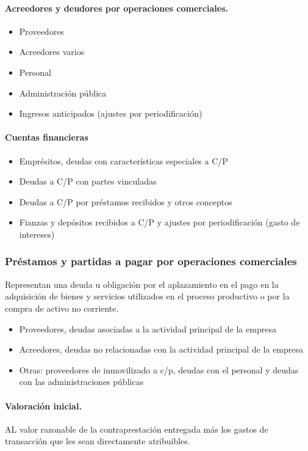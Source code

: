 \paragraph{Acreedores y deudores por operaciones comerciales.}
\begin{itemize}
    \item Proveedores
    \item Acreedores varios
    \item Personal
    \item Administración pública
    \item Ingresos anticipados (ajustes por periodificación)
\end{itemize}

\paragraph{Cuentas financieras}
\begin{itemize}
    \item Emprésitos, deudas con características especiales a C/P
    \item Deudas a C/P con partes vinculadas
    \item Deudas a C/P por préstamos recibidos y otros conceptos
    \item Fianzas y depósitos recibidos a C/P y ajustes por periodificación (gasto de intereses)
\end{itemize}

\subsubsection{Préstamos y partidas a pagar por operaciones comerciales}
Representan una deuda u obligación por el aplazamiento en el pago en la adquisición de bienes y servicios utilizados en el proceso productivo o por la compra de activo no corriente.
\begin{itemize}
    \item Proveedores, deudas asociadas a la actividad principal de la empresa
    \item Acreedores, deudas no relacionadas con la actividad principal de la empresa
    \item Otras: proveedores de inmovilizado a c/p, deudas con el personal y deudas con las administraciones públicas
\end{itemize}

\paragraph{Valoración inicial.}
AL valor razonable de la contraprestación entregada más los gastos de transacción que les sean directamente atribuibles.

